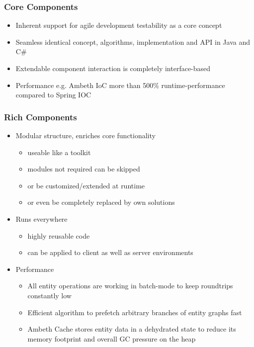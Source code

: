 \subsubsection{Core Components}
\begin{itemize}
	\item Inherent support for agile development \newline testability as a core concept
	\item Seamless \newline identical concept, algorithms, implementation and API in Java and C\#
	\item Extendable \newline component interaction is completely interface-based
	\item Performance \newline e.g. Ambeth IoC more than 500\% runtime-performance compared to Spring IOC
\end{itemize}

\subsubsection{Rich Components}
\begin{itemize}
	\item Modular structure, enriches core functionality
	\begin{itemize}
		\item useable like a toolkit
		\item modules not required can be skipped
		\item or be customized/extended at runtime
		\item or even be completely replaced by own solutions
	\end{itemize}
	\item Runs everywhere
	\begin{itemize}
		\item highly reusable code
		\item can be applied to client as well as server environments
	\end{itemize}
	\item Performance
	\begin{itemize}
		\item All entity operations are working in batch-mode to keep roundtrips constantly low
		\item Efficient algorithm to prefetch arbitrary branches of entity graphs fast
		\item Ambeth Cache stores entity data in a dehydrated state to reduce its memory footprint and overall GC pressure on the heap
	\end{itemize}	
\end{itemize}


